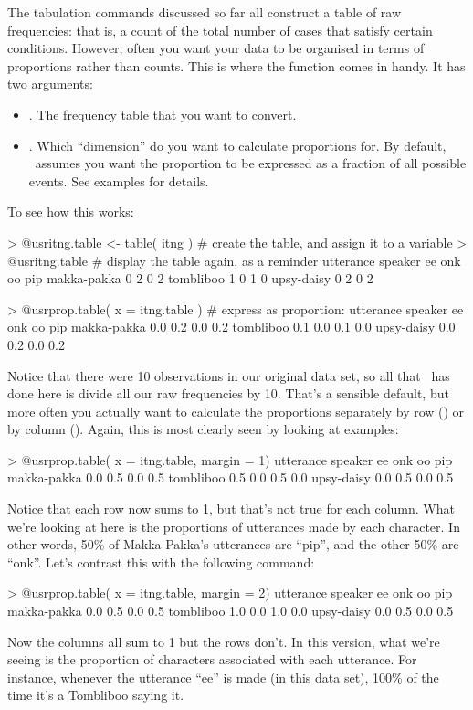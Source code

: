The tabulation commands discussed so far all construct a table of raw frequencies: that is, a count of the total number of cases that satisfy certain conditions. However, often you want your data to be organised in terms of proportions rather than counts. This is where the  function comes in handy. It has two arguments:
\begin{itemize} \itemsep 0pt
\item {}. The frequency table that you want to convert.
\item {}. Which ``dimension'' do you want to calculate proportions for. By default, \R\ assumes you want the proportion to be expressed as a fraction of all possible events. See examples for details.
\end{itemize}
To see how this works:
\begin{rblock1}
> @usr{itng.table <- table( itng )}  # create the table, and assign it to a variable
> @usr{itng.table}                   # display the table again, as a reminder
             utterance
speaker       ee onk oo pip
  makka-pakka  0   2  0   2
  tombliboo    1   0  1   0
  upsy-daisy   0   2  0   2
  
> @usr{prop.table( x = itng.table )} # express as proportion:
             utterance
speaker        ee onk  oo pip
  makka-pakka 0.0 0.2 0.0 0.2
  tombliboo   0.1 0.0 0.1 0.0
  upsy-daisy  0.0 0.2 0.0 0.2
\end{rblock1}
Notice that there were 10 observations in our original data set, so all that \R\ has done here is divide all our raw frequencies by 10. That's a sensible default, but more often you actually want to calculate the proportions separately by row () or by column (). Again, this is most clearly seen by looking at examples:
\begin{rblock1}
> @usr{prop.table( x = itng.table, margin = 1)}
             utterance
speaker        ee onk  oo pip
  makka-pakka 0.0 0.5 0.0 0.5
  tombliboo   0.5 0.0 0.5 0.0
  upsy-daisy  0.0 0.5 0.0 0.5
\end{rblock1}
Notice that each row now sums to 1, but that's not true for each column. What we're looking at here is the proportions of utterances made by each character. In other words, 50\% of Makka-Pakka's utterances are ``pip'', and the other 50\% are ``onk''. Let's contrast this with the following command:
\begin{rblock1}
> @usr{prop.table( x = itng.table, margin = 2)}
             utterance
speaker        ee onk  oo pip
  makka-pakka 0.0 0.5 0.0 0.5
  tombliboo   1.0 0.0 1.0 0.0
  upsy-daisy  0.0 0.5 0.0 0.5
\end{rblock1}
Now the columns all sum to 1 but the rows don't. In this version, what we're seeing is the proportion of characters associated with each utterance. For instance, whenever the utterance ``ee'' is made (in this data set), 100\% of the time it's a Tombliboo saying it. 




